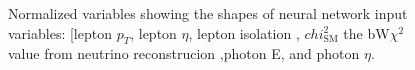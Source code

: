 \begin{figure}[h!]
\vspace{-4.5mm}
\hfil
{}
\caption{Normalized variables showing the shapes of neural network input variables: [lepton $p_T$, lepton $\eta$, lepton isolation , $chi^2_{\text{SM}}$ the bW$\chi^2$ value from neutrino reconstrucion ,photon E, and photon $\eta$.  }
\label{fig:VarPlots5}
\end{figure}